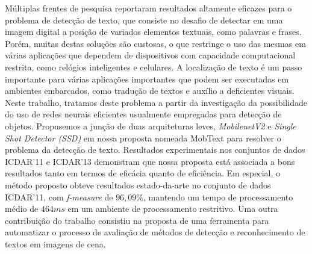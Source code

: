 Múltiplas frentes de pesquisa reportaram resultados altamente eficazes para o problema de detecção de texto, que consiste no desafio de detectar em uma imagem digital a posição de variados elementos textuais, como palavras e frases. Porém, muitas destas soluções são custosas, o que restringe o uso das mesmas em várias aplicações que dependem de dispositivos com capacidade computacional restrita, como relógios inteligentes e celulares. A localização de texto é um passo importante para várias aplicações importantes que podem ser executadas em ambientes embarcados, como tradução de textos e auxílio a deficientes visuais. Neste trabalho, tratamos deste problema a partir da investigação da possibilidade do uso de redes neurais eficientes usualmente empregadas para detecção de objetos. Propusemos a junção de duas arquiteturas leves, {\em MobilenetV2} e {\em Single Shot Detector (SSD)} em nossa proposta nomeada MobText para resolver o problema da detecção de texto. Resultados experimentais nos conjuntos de dados ICDAR'11 e ICDAR'13 demonstram que nossa proposta está associada a bons resultados tanto em termos de eficácia quanto de eficiência. Em especial, o método proposto obteve resultados estado-da-arte no conjunto de dados ICDAR'11, com {\em f-measure} de $96,09\%$, mantendo um tempo de processamento médio de $464 ms$ em um ambiente de processamento restritivo. Uma outra contribuição do trabalho consistiu na proposta de uma ferramenta para automatizar o processo de avaliação de métodos de detecção e reconhecimento de textos em imagens de cena.


